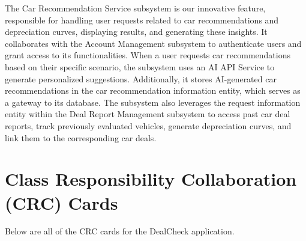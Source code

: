 \documentclass[]{article}
\begin{document}
The Car Recommendation Service subsystem is our innovative feature, responsible for handling user requests related to car recommendations and depreciation curves, displaying results, and generating these insights. It collaborates with the Account Management subsystem to authenticate users and grant access to its functionalities. When a user requests car recommendations based on their specific scenario, the subsystem uses an AI API Service to generate personalized suggestions. Additionally, it stores AI-generated car recommendations in the car recommendation information entity, which serves as a gateway to its database. The subsystem also leverages the request information entity within the Deal Report Management subsystem to access past car deal reports, track previously evaluated vehicles, generate depreciation curves, and link them to the corresponding car deals.



\pagebreak

\section{Class Responsibility Collaboration (CRC) Cards}
\label{sec:class_responsibility_collaboration_crc_cards}
Below are all of the CRC cards for the DealCheck application.
\end{document}
